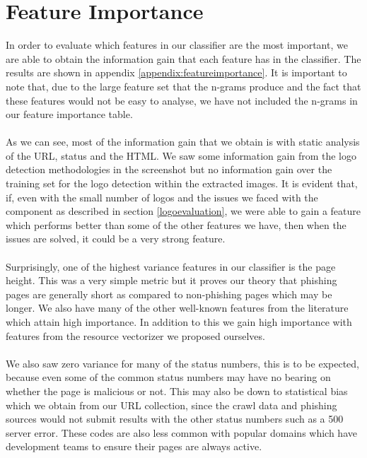\documentclass[12pt,twoside]{report}
\begin{document}
\section{Feature Importance}
In order to evaluate which features in our classifier are the most important, we are able to obtain the information gain that each feature has in the classifier. The results are shown in appendix \ref{appendix:featureimportance}. It is important to note that, due to the large feature set that the n-grams produce and the fact that these features would not be easy to analyse, we have not included the n-grams in our feature importance table.
\\\\
As we can see, most of the information gain that we obtain is with static analysis of the URL, status and the HTML. We saw some information gain from the logo detection methodologies in the screenshot but no information gain over the training set for the logo detection within the extracted images. It is evident that, if, even with the small number of logos and the issues we faced with the component as described in section \ref{logoevaluation}, we were able to gain a feature which performs better than some of the other features we have, then when the issues are solved, it could be a very strong feature.
\\\\
Surprisingly, one of the highest variance features in our classifier is the page height. This was a very simple metric but it proves our theory that phishing pages are generally short as compared to non-phishing pages which may be longer. We also have many of the other well-known features from the literature which attain high importance. In addition to this we gain high importance with features from the resource vectorizer we proposed ourselves.
\\\\
We also saw zero variance for many of the status numbers, this is to be expected, because even some of the common status numbers may have no bearing on whether the page is malicious or not. This may also be down to statistical bias which we obtain from our URL collection, since the crawl data and phishing sources would not submit results with the other status numbers such as a 500 server error. These codes are also less common with popular domains which have development teams to ensure their pages are always active.
\end{document}
